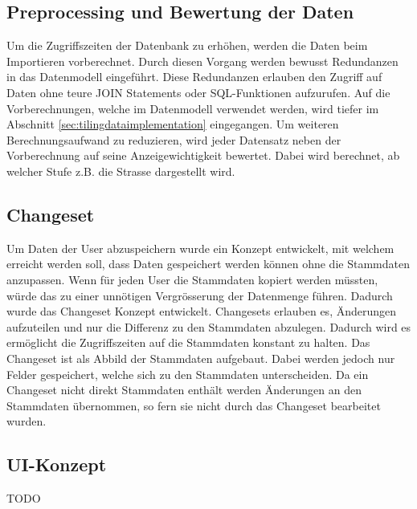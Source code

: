 \subsection{Preprocessing und Bewertung der Daten}\label{sec:concept_preprocessing}
Um die Zugriffszeiten der Datenbank zu erhöhen, werden die Daten beim Importieren vorberechnet. Durch diesen Vorgang werden bewusst Redundanzen in das Datenmodell eingeführt. Diese Redundanzen erlauben den Zugriff auf Daten ohne teure JOIN Statements oder SQL-Funktionen aufzurufen. Auf die Vorberechnungen, welche im Datenmodell verwendet werden, wird tiefer im Abschnitt \ref{sec:tilingdataimplementation}  eingegangen. Um weiteren Berechnungsaufwand zu reduzieren, wird jeder Datensatz neben der Vorberechnung auf seine Anzeigewichtigkeit bewertet. Dabei wird berechnet, ab welcher Stufe z.B. die Strasse dargestellt wird.

\subsection{Changeset}
Um Daten der User abzuspeichern wurde ein Konzept entwickelt, mit welchem erreicht werden soll, dass Daten gespeichert werden können ohne die Stammdaten anzupassen. Wenn für jeden User die Stammdaten kopiert werden müssten, würde das zu einer unnötigen Vergrösserung der Datenmenge führen. Dadurch wurde das Changeset Konzept entwickelt. Changesets erlauben es, Änderungen aufzuteilen und nur die Differenz zu den Stammdaten abzulegen. Dadurch wird es ermöglicht die Zugriffszeiten auf die Stammdaten konstant zu halten. Das Changeset ist als Abbild der Stammdaten aufgebaut. Dabei werden jedoch nur Felder gespeichert, welche sich zu den Stammdaten unterscheiden. Da ein Changeset nicht direkt Stammdaten enthält werden Änderungen an den Stammdaten übernommen, so fern sie nicht durch das Changeset bearbeitet wurden.
\subsection{UI-Konzept}
TODO
